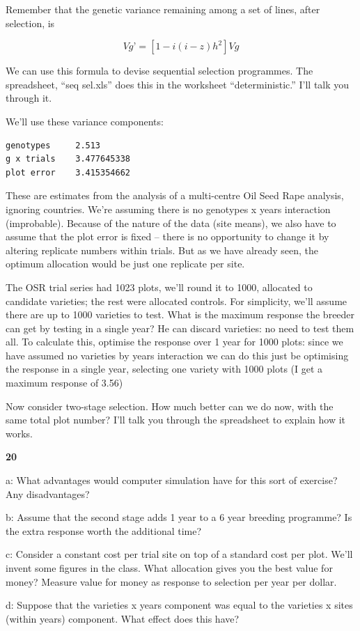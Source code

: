 \documentclass[
]{book}
\makeatletter
\newenvironment{kframe}{%
\medskip{}
\setlength{\fboxsep}{.8em}
 \def\at@end@of@kframe{}%
 \ifinner\ifhmode%
  \def\at@end@of@kframe{\end{minipage}}%
  \begin{minipage}{\columnwidth}%
 \fi\fi%
 \def\FrameCommand##1{\hskip\@totalleftmargin \hskip-\fboxsep
 \colorbox{shadecolor}{##1}\hskip-\fboxsep
     \hskip-\linewidth \hskip-\@totalleftmargin \hskip\columnwidth}%
 \MakeFramed {\advance\hsize-\width
   \@totalleftmargin\z@ \linewidth\hsize
   \@setminipage}}%
 {\par\unskip\endMakeFramed%
 \at@end@of@kframe}
\newenvironment{rmdblock}[1]
  {
  \begin{itemize}
  \renewcommand{\labelitemi}{
    \raisebox{-.7\height}[0pt][0pt]{
      {\setkeys{Gin}{width=3em,keepaspectratio}\texttt{[image: images/\#1]}}
    }
  }
  \setlength{\fboxsep}{1em}
  \begin{kframe}
  \item
  }
  {
  \end{kframe}
  \end{itemize}
  }
\newenvironment{rmdquiz}
  {\begin{rmdblock}{quiz}}
  {\end{rmdblock}}
\makeatother
\begin{document}
Remember that the genetic variance remaining among a set of lines, after selection, is

\[Vg’ = [1-i(i-z)h^2 ]Vg\]

We can use this formula to devise sequential selection programmes. The spreadsheet, ``seq sel.xls'' does this in the worksheet ``deterministic.'' I'll talk you through it.

We'll use these variance components:

\begin{verbatim}
genotypes     2.513
g x trials    3.477645338
plot error    3.415354662
\end{verbatim}

These are estimates from the analysis of a multi-centre Oil Seed Rape analysis, ignoring countries. We're assuming there is no genotypes x years interaction (improbable). Because of the nature of the data (site means), we also have to assume that the plot error is fixed -- there is no opportunity to change it by altering replicate numbers within trials. But as we have already seen, the optimum allocation would be just one replicate per site.

The OSR trial series had 1023 plots, we'll round it to 1000, allocated to candidate varieties; the rest were allocated controls. For simplicity, we'll assume there are up to 1000 varieties to test. What is the maximum response the breeder can get by testing in a single year? He can discard varieties: no need to test them all. To calculate this, optimise the response over 1 year for 1000 plots: since we have assumed no varieties by years interaction we can do this just be optimising the response in a single year, selecting one variety with 1000 plots (I get a maximum response of 3.56)

Now consider two-stage selection. How much better can we do now, with the same total plot number? I'll talk you through the spreadsheet to explain how it works.

\begin{rmdquiz}
\textbf{20}

a: What advantages would computer simulation have for this sort of exercise? Any disadvantages?

b: Assume that the second stage adds 1 year to a 6 year breeding programme? Is the extra response worth the additional time?

c: Consider a constant cost per trial site on top of a standard cost per plot. We'll invent some figures in the class. What allocation gives you the best value for money? Measure value for money as response to selection per year per dollar.

d: Suppose that the varieties x years component was equal to the varieties x sites (within years) component. What effect does this have?
\end{rmdquiz}
\end{document}
